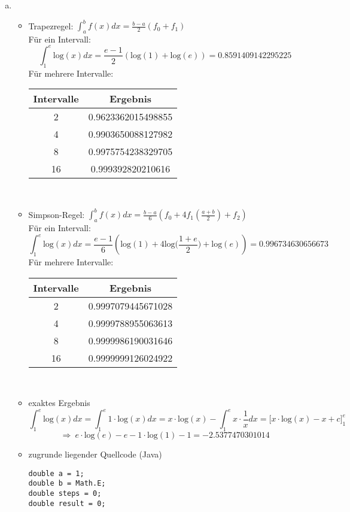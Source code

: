 \documentclass[a4paper,10pt]{article}
\begin{document}
	\begin{enumerate}[a)]
		\item 
		\begin{itemize}
			\item Trapezregel: $\int_{a}^{b} f(x) dx = \frac{b - a}{2}(f_0 + f_1)$ \\
			Für ein Intervall: 
			\[
			\int_{1}^{e}\mathrm{log}(x)dx = \dfrac{e - 1}{2}(\mathrm{log}(1) + \mathrm{log}(e)) = 0.8591409142295225
			\]
			Für mehrere Intervalle:\\
			\begin{tabular}{|c|c|}
				\hline 
				Intervalle & Ergebnis \\ 
				\hline 
				2 & 0.9623362015498855 \\ 
				\hline 
				4 & 0.9903650088127982 \\ 
				\hline 
				8 & 0.9975754238329705\\ 
				\hline 
				16 & 0.999392820210616\\ 
				\hline 
			\end{tabular} \\
			\item Simpson-Regel: $\int_{a}^{b} f(x) dx = \frac{b - a}{6}(f_0 + 4f_1(\frac{a + b}{2}) + f_2)$\\
			Für ein Intervall:
			\[
			\int_{1}^{e}\mathrm{log}(x)dx = \dfrac{e - 1}{6}(\mathrm{log}(1) + 4\mathrm{log}\Big(\frac{1+e}{2}\Big) + \mathrm{log}(e)) = 0.996734630656673
			\]
			Für mehrere Intervalle:\\
			\begin{tabular}{|c|c|}
				\hline 
				Intervalle & Ergebnis \\ 
				\hline 
				2 & 0.9997079445671028 \\ 
				\hline 
				4 & 0.9999788955063613 \\ 
				\hline 
				8 & 0.9999986190031646\\ 
				\hline 
				16 & 0.9999999126024922\\ 
				\hline 
			\end{tabular} \\
			\item exaktes Ergebnis\\
			\[
			\int^e_1 \mathrm{log}(x)dx = \int^e_1 1 \cdot \mathrm{log}(x)dx = x \cdot \mathrm{log}(x) - \int^e_1 x \cdot \frac{1}{x}dx = \big[x \cdot \mathrm{log}(x) - x + c \big]^e_1
			\]
			\[
			\Rightarrow \ e \cdot \mathrm{log}(e) - e - 1 \cdot \mathrm{log}(1) - 1 = -2.5377470301014
			\]
			\item 
			zugrunde liegender Quellcode (Java)
			\begin{lstlisting}
double a = 1;
double b = Math.E;
double steps = 0;
double result = 0;


\end{lstlisting}
\end{itemize}
\end{enumerate}
\end{document}
